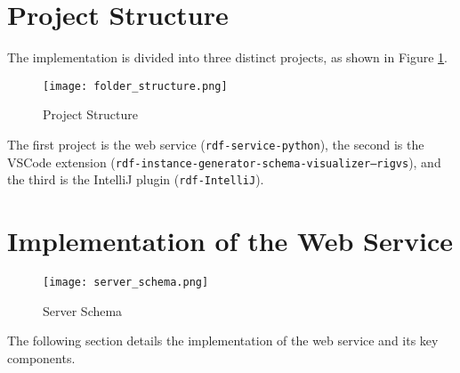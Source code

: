 \section{Project Structure\label{sec:projectstructure}}

The implementation is divided into three distinct projects, as shown in Figure \ref{fig:projectstructure}.

\begin{figure}[htb]
  \centering
  \texttt{[image: folder\_structure.png]}
  \caption{Project Structure}
  \label{fig:projectstructure}
\end{figure}

The first project is the web service (\texttt{rdf-service-python}), the second is the VSCode extension (\texttt{rdf-instance-generator-schema-visualizer--rigvs}), and the third is the IntelliJ plugin (\texttt{rdf-IntelliJ}).

\section{Implementation of the Web Service\label{sec:webservice}}

\begin{figure}[htb]
    \centering
    \texttt{[image: server\_schema.png]}
    \caption{Server Schema}
    \label{fig:serverschema}
\end{figure}

\noindent
The following section details the implementation of the web service and its key components.
\\
\\
